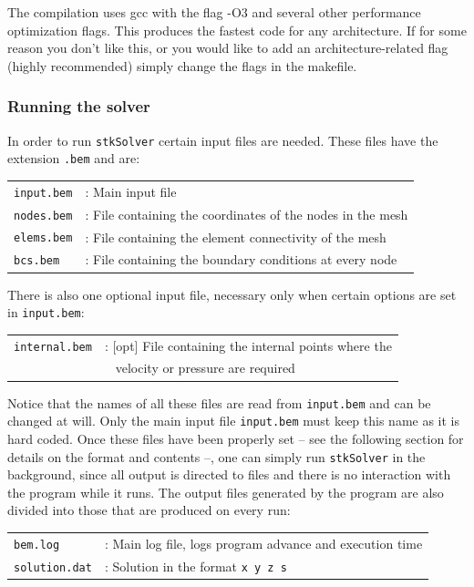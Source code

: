 \documentclass[12pt]{article}
\begin{document}
The compilation uses gcc with the flag -O3 and several other performance optimization flags. This produces the fastest code for any architecture. If for some reason you don't like this, or you would like to add an architecture-related flag (highly recommended) simply change the flags in the makefile. 

\subsubsection*{Running the solver}
In order to run \verb+stkSolver+ certain input files are needed. These files have the extension \verb+.bem+ and are:

\begin{tabular}{ll}
\texttt{input.bem}&: Main input file\\
\texttt{nodes.bem}&: File containing the coordinates of the nodes in the mesh\\
\texttt{elems.bem}&: File containing the element connectivity of the mesh\\
\texttt{bcs.bem}&: File containing the boundary conditions at every node\\
\end{tabular}

There is also one optional input file, necessary only when certain options are set in \verb+input.bem+:

\begin{tabular}{ll}
\texttt{internal.bem} &: [opt] File containing the internal points where the\\
  & \verb+ + velocity or pressure are required\\
\end{tabular}

Notice that the names of all these files are read from \verb+input.bem+ and can be changed at will. Only the main input file \verb+input.bem+ must keep this name as it is hard coded. Once these files have been properly set -- see the following section for details on the format and contents --, one can simply run \verb+stkSolver+ in the background, since all output is directed to files and there is no interaction with the program while it runs. The output files generated by the program are also divided into those that are produced on every run:

\begin{tabular}{ll}
\texttt{bem.log}&: Main log file, logs program advance and execution time\\
\texttt{solution.dat}&: Solution in the format \texttt{x y z s}
\end{tabular}
\end{document}
